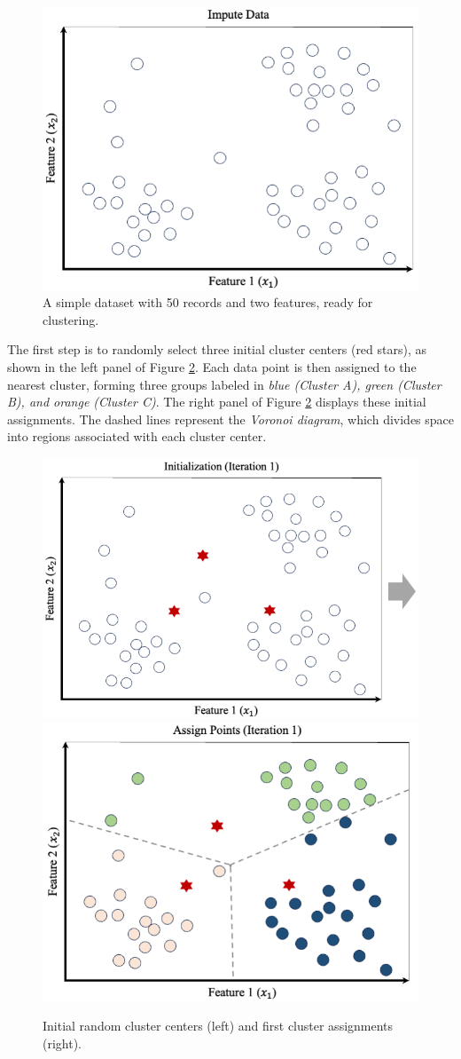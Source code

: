 \documentclass[
]{book}
\theoremstyle{definition}
\theoremstyle{definition}
\theoremstyle{definition}
\theoremstyle{definition}
\theoremstyle{remark}
\begin{document}
\begin{figure}

{\centering \includegraphics[width=0.7\linewidth]{images/cluster_ex_1} 

}

\caption{A simple dataset with 50 records and two features, ready for clustering.}\label{fig:cluster-ex-1}
\end{figure}

The first step is to randomly select three initial cluster centers (red stars), as shown in the left panel of Figure \ref{fig:cluster-ex-2}. Each data point is then assigned to the nearest cluster, forming three groups labeled in \emph{blue (Cluster A), green (Cluster B), and orange (Cluster C)}. The right panel of Figure \ref{fig:cluster-ex-2} displays these initial assignments. The dashed lines represent the \emph{Voronoi diagram}, which divides space into regions associated with each cluster center.

\begin{figure}

{\centering \includegraphics[width=0.45\linewidth]{images/cluster_ex_2} \includegraphics[width=0.45\linewidth]{images/cluster_ex_3} 

}

\caption{Initial random cluster centers (left) and first cluster assignments (right).}\label{fig:cluster-ex-2}
\end{figure}
\end{document}

